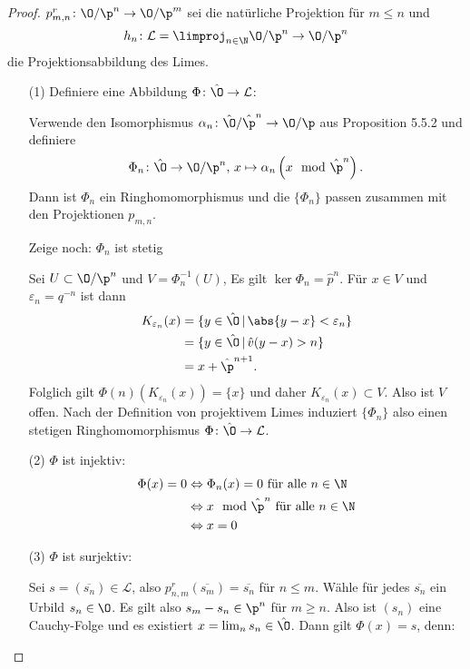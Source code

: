 

\begin{proof}
$p^r_{m,n} \colon \O / \p^n \rightarrow \O/ \p^m$ sei die natürliche Projektion für $m\leq n$
und 
\[ h_n \colon \mathcal{L} = \limproj_{n\in\N} \O/\p^n \to \O/\p^n
\]
die Projektionsabbildung des Limes.
\begin{itemize} 
\item[(1)] Definiere eine Abbildung $\Phi \colon \hat{\O} \to\mathcal{L}$:
	
		Verwende den Isomorphismus $\alpha_n \colon \hat{\O}/ \hat{\p}^n \to \O / \p$ aus Proposition 5.5.2 und definiere 
		\[ \Phi_n \colon \hat{\O} \to \O / \p^n, \, x \mapsto \alpha_n \left(  x \mod \hat{\p}^n \right).
		\]
		Dann ist $\Phi_n$ ein Ringhomomorphismus und die $\{ \Phi_n \}$ passen zusammen mit den Projektionen $p_{m,n}$.
		
		\bigskip Zeige noch: $\Phi_n$ ist stetig
		
		Sei $U \subset \O/\p^n$ und $V=\Phi_n^{-1}(U)$, Es gilt $\ker \Phi_n = \hat{p}^n$. Für $x\in V$ und $\varepsilon_n = q^{-n}$ ist dann
		\begin{align*}
			K_{\varepsilon_n}(x) 
			&= \{ y \in \hat{\O} \,|\, \abs{y-x}< \varepsilon_n  \} \\
			&= \{ y \in \hat{\O} \,|\, \hat{v}(y-x) > n  \} \\
			&= x+ \hat{\p}^{n+1}.
		\end{align*}
		Folglich gilt $\Phi(n)( K_{\varepsilon_n}(x)  ) = \{x\}$ und daher $K_{\varepsilon_n}(x)  \subset V$. Also ist $V$ offen.
		Nach der Definition von projektivem Limes induziert $\{\Phi_n \}$ also einen stetigen Ringhomomorphismus  $\Phi \colon \hat{\O} \to\mathcal{L}$.
\item[(2)] $\Phi$ ist injektiv:
\begin{align*}
\Phi(x) = 0
&\Leftrightarrow \Phi_n(x) = 0 \text{ für alle } n \in \N \\
&\Leftrightarrow x \mod \hat{\p}^n  \text{ für alle } n \in \N \\
&\Leftrightarrow x=0
\end{align*} 
\item[(3)] $\Phi$ ist surjektiv:

Sei $s=(\overline{s_n}) \in \mathcal{L}$, also $p^r_{n,m}(\overline{s_m}) = \overline{s_n}$ für $n\leq m$. Wähle für jedes $\overline{s_n}$ ein Urbild $s_n \in \O$. Es gilt also $s_m-s_n \in \p^n$ für $m\geq n$. Also ist $(s_n)$ eine Cauchy-Folge und es existiert $x=\lim_n s_n \in \hat{\O}$.
Dann gilt $\Phi(x)=s$, denn:


\end{itemize}
\end{proof}
